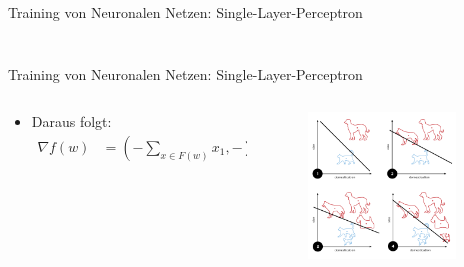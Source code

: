 \documentclass[aspectratio=1610, xcolor=dvipsnames, 9pt]{beamer}
\begin{document}
\begin{frame}{Training von Neuronalen Netzen: Single-Layer-Perceptron}
\begin{columns}
\begin{column}{0.3\textwidth}
\begin{figure}
       \end{figure}
          \end{column}
        \end{columns}
      \end{frame}

      \begin{frame}{Training von Neuronalen Netzen: Single-Layer-Perceptron}
        \begin{columns}
          \begin{column}{0.7\textwidth}
            \begin{itemize}

              \item Daraus folgt: \begin{align} 
                                  \nabla f(w) &= \left(  -\sum_{x \in F(w)} x_1,  -\sum_{x \in F(w)} x_2, ... ,  -\sum_{x \in F(w)} x_n   \right)
                                              &= -\sum_{x \in F(w)} x
                                  \end{align}
            \end{itemize}
          \end{column}
          \begin{column}{0.3\textwidth}
       \begin{figure}
       \centering
                   \includegraphics[width=0.9\textwidth]{images/Perceptron_example.svg.png}
       \end{figure}
          \end{column}
        \end{columns}
      \end{frame}
\end{document}
